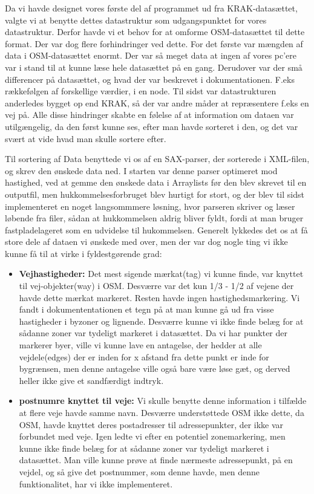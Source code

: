 Da vi havde designet vores første del af programmet ud fra KRAK-datasættet, valgte vi at benytte dettes datastruktur som udgangspunktet for vores datastruktur. Derfor havde vi et behov for at omforme OSM-datasættet til dette format. Der var dog flere forhindringer ved dette. For det første var mængden af data i OSM-datasættet enormt. Der var så meget data at ingen af vores pc'ere var i stand til at kunne læse hele datasættet på en gang. Derudover var der  små differencer på datasættet, og hvad der var beskrevet i dokumentationen. F.eks rækkefølgen af forskellige værdier, i en node. Til sidst var datastrukturen anderledes bygget op end KRAK, så der var andre måder at repræsentere f.eks en vej på. Alle disse hindringer skabte en følelse af at information om dataen var utilgængelig, da den først kunne ses, efter man havde sorteret i den, og det var svært at vide hvad man skulle sortere efter.

Til sortering af Data benyttede vi os af en SAX-parser, der sorterede i XML-filen, og skrev den ønskede data ned. I starten var denne parser optimeret mod hastighed, ved at gemme den ønskede data i Arraylists før den blev skrevet til en outputfil, men hukkommelsesforbruget blev hurtigt for stort, og der blev til sidst implementeret en noget langsommmere løsning, hvor parseren skriver og læser løbende fra filer, sådan at hukkommelsen aldrig bliver fyldt, fordi at man bruger fastpladelageret som en udvidelse til hukommelsen. Generelt lykkedes det os at få store dele af dataen vi ønskede med over, men der var dog nogle ting vi ikke kunne få til at virke i fyldestgørende grad:

\begin{itemize}
	\item \textbf{Vejhastigheder:} Det mest sigende mærkat(tag) vi kunne finde, var knyttet til vej-objekter(way) i OSM. Desværre var det kun 1/3 - 1/2 af vejene der havde dette mærkat markeret. Resten havde ingen hastighedsmarkering. Vi fandt i dokumententationen et tegn på at man kunne gå ud fra visse hastigheder i byzoner og lignende. Desværre kunne vi ikke finde belæg for at sådanne zoner var tydeligt markeret i datasættet. Da vi har punkter der markerer byer, ville vi kunne lave en antagelse, der hedder at alle vejdele(edges) der er inden for x afstand fra dette punkt er inde for bygrænsen, men denne antagelse ville også bare være løse gæt, og derved heller ikke give et sandfærdigt indtryk.
	\item \textbf{postnumre knyttet til veje:} Vi skulle benytte denne information i tilfælde at flere veje havde samme navn. Desværre understøttede OSM ikke dette, da OSM, havde knyttet deres postadresser til adressepunkter, der ikke var forbundet med veje. Igen ledte vi efter en potentiel zonemarkering, men kunne ikke finde belæg for at sådanne zoner var tydeligt markeret i datasættet. Man ville kunne prøve at finde nærmeste adressepunkt, på en vejdel, og så give det postnummer, som denne havde, men denne funktionalitet, har vi ikke implementeret.
\end{itemize}

